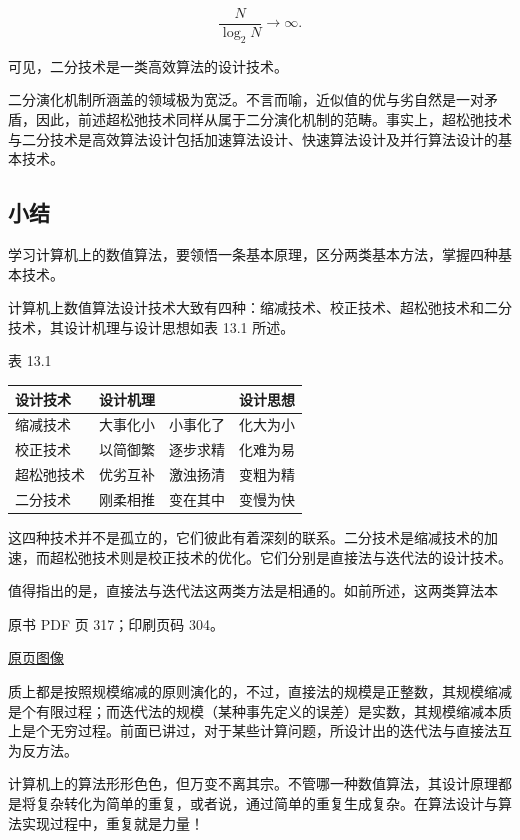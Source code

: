 \[
\frac{N}{\log_2N}\longrightarrow\infty.
\]

可见，二分技术是一类高效算法的设计技术。

二分演化机制所涵盖的领域极为宽泛。不言而喻，近似值的优与劣自然是一对矛盾，因此，前述超松弛技术同样从属于二分演化机制的范畴。事实上，超松弛技术与二分技术是高效算法设计包括加速算法设计、快速算法设计及并行算法设计的基本技术。

\subsection{小结}\label{ch13-ux5c0fux7ed3}

学习计算机上的数值算法，要领悟一条基本原理，区分两类基本方法，掌握四种基本技术。

计算机上数值算法设计技术大致有四种：缩减技术、校正技术、超松弛技术和二分技术，其设计机理与设计思想如表 13.1 所述。

表 13.1

{\def\LTcaptype{none} %
\begin{longtable}[]{@{}lll@{}}
\toprule\noalign{}
设计技术 & 设计机理 & 设计思想 \\
\midrule\noalign{}
\endhead
\bottomrule\noalign{}
\endlastfoot
缩减技术 & 大事化小　小事化了 & 化大为小 \\
校正技术 & 以简御繁　逐步求精 & 化难为易 \\
超松弛技术 & 优劣互补　激浊扬清 & 变粗为精 \\
二分技术 & 刚柔相推　变在其中 & 变慢为快 \\
\end{longtable}
}

这四种技术并不是孤立的，它们彼此有着深刻的联系。二分技术是缩减技术的加速，而超松弛技术则是校正技术的优化。它们分别是直接法与迭代法的设计技术。

值得指出的是，直接法与迭代法这两类方法是相通的。如前所述，这两类算法本

\clearpage

原书 PDF 页 317；印刷页码 304。

\href{source-images/pdf-317.jpeg}{原页图像}

质上都是按照规模缩减的原则演化的，不过，直接法的规模是正整数，其规模缩减是个有限过程；而迭代法的规模（某种事先定义的误差）是实数，其规模缩减本质上是个无穷过程。前面已讲过，对于某些计算问题，所设计出的迭代法与直接法互为反方法。

计算机上的算法形形色色，但万变不离其宗。不管哪一种数值算法，其设计原理都是将复杂转化为简单的重复，或者说，通过简单的重复生成复杂。在算法设计与算法实现过程中，重复就是力量！

